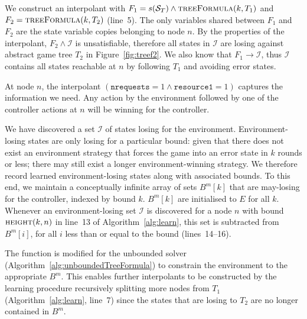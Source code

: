 We construct an interpolant with $F_1 = s(\mathcal{S}_T) \land \textsc{treeFormula}(k, T_1)$ and $F_2 = \textsc{treeFormula}(k, T_2)$ (line~5). The only variables shared between $F_1$ and $F_2$ are the state variable copies belonging to node $n$. By the properties of the interpolant, $F_2 \land \mathcal{I}$ is unsatisfiable, therefore all states in $\mathcal{I}$ are losing against abstract game tree $T_2$ in Figure~\ref{fig:treef2}.  We also know that $F_1 \to \mathcal{I}$, thus $\mathcal{I}$ contains all states reachable at $n$ by following $T_1$ and avoiding error states.  


At node $n$, the interpolant $(\texttt{nrequests} = 1 \land
\texttt{resource1} = 1)$ captures the information we need. Any action by the
environment followed by one of the controller actions at $n$ will be
winning for the controller.

We have discovered a set $\mathcal{I}$ of states losing for the environment.
Environment-losing states are only losing for a particular bound: given that
there does not exist an environment strategy that forces the game into an error
state in $k$ rounds or less; there may still exist a longer environment-winning
strategy.  We therefore record learned environment-losing states along with
associated bounds.  To this end, we maintain a conceptually infinite array of
sets $B^m[k]$ that are may-losing for the controller, indexed by bound $k$.
$B^m[k]$ are initialised to $E$ for all $k$.  Whenever an environment-losing
set $\mathcal{I}$ is discovered for a node $n$ with bound $\textsc{height}(k,
n)$ in line~13 of Algorithm~\ref{alg:learn}, this set is subtracted from
$B^m[i]$, for all $i$ less than or equal to the bound (lines~14--16).

The \textsc{} function is modified for the unbounded
solver (Algorithm~\ref{alg:unboundedTreeFormula}) to constrain the environment
to the appropriate $B^m$. This enables further interpolants to be constructed
by the learning procedure recursively splitting more nodes from $T_1$
(Algorithm~\ref{alg:learn}, line~7) since the states that are losing to $T_2$
are no longer contained in $B^m$.

